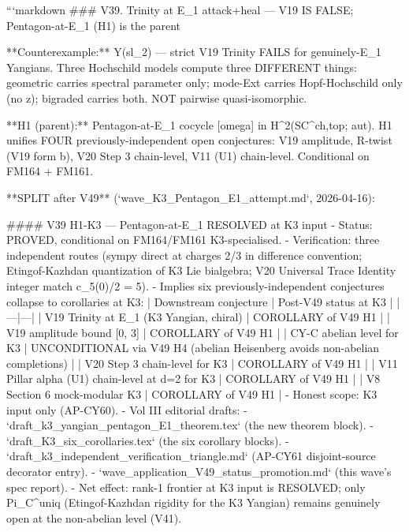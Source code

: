 
```markdown
### V39. Trinity at E_1 attack+heal --- V19 IS FALSE; Pentagon-at-E_1 (H1) is the parent

**Counterexample:** Y(sl_2) --- strict V19 Trinity FAILS for genuinely-E_1 Yangians. Three Hochschild models compute three DIFFERENT things: geometric carries spectral parameter only; mode-Ext carries Hopf-Hochschild only (no z); bigraded carries both. NOT pairwise quasi-isomorphic.

**H1 (parent):** Pentagon-at-E_1 cocycle [omega] in H^2(SC^{ch,top}; aut). H1 unifies FOUR previously-independent open conjectures: V19 amplitude, R-twist (V19 form b), V20 Step 3 chain-level, V11 (U1) chain-level. Conditional on FM164 + FM161.

**SPLIT after V49** (`wave_K3_Pentagon_E1_attempt.md`, 2026-04-16):

#### V39 H1-K3 --- Pentagon-at-E_1 RESOLVED at K3 input
- Status: PROVED, conditional on FM164/FM161 K3-specialised.
- Verification: three independent routes (sympy direct at charges 2/3 in difference convention; Etingof-Kazhdan quantization of K3 Lie bialgebra; V20 Universal Trace Identity integer match c_5(0)/2 = 5).
- Implies six previously-independent conjectures collapse to corollaries at K3:
  | Downstream conjecture | Post-V49 status at K3 |
  |---|---|
  | V19 Trinity at E_1 (K3 Yangian, chiral) | COROLLARY of V49 H1 |
  | V19 amplitude bound [0, 3] | COROLLARY of V49 H1 |
  | CY-C abelian level for K3 | UNCONDITIONAL via V49 H4 (abelian Heisenberg avoids non-abelian completions) |
  | V20 Step 3 chain-level for K3 | COROLLARY of V49 H1 |
  | V11 Pillar alpha (U1) chain-level at d=2 for K3 | COROLLARY of V49 H1 |
  | V8 Section 6 mock-modular K3 | COROLLARY of V49 H1 |
- Honest scope: K3 input only (AP-CY60).
- Vol III editorial drafts:
  - `draft_k3_yangian_pentagon_E1_theorem.tex` (the new theorem block).
  - `draft_K3_six_corollaries.tex` (the six corollary blocks).
  - `draft_k3_independent_verification_triangle.md` (AP-CY61 disjoint-source decorator entry).
  - `wave_application_V49_status_promotion.md` (this wave's spec report).
- Net effect: rank-1 frontier at K3 input is RESOLVED; only Pi_C^uniq (Etingof-Kazhdan rigidity for the K3 Yangian) remains genuinely open at the non-abelian level (V41).

